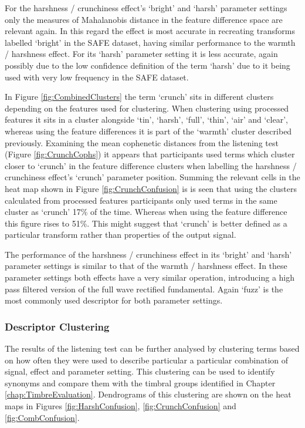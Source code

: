 			For the harshness / crunchiness effect's `bright' and `harsh' parameter settings only the measures
			of Mahalanobis distance in the feature difference space are relevant again. In this regard the
			effect is most accurate in recreating transforms labelled `bright' in the SAFE dataset, having
			similar performance to the warmth / harshness effect. For its `harsh' parameter setting it is less
			accurate, again possibly due to the low confidence definition of the term `harsh' due to it being
			used with very low frequency in the SAFE dataset.

			In Figure \ref{fig:CombinedClusters} the term `crunch' sits in different clusters depending on the
			features used for clustering. When clustering using processed features it sits in a cluster
			alongside `tin', `harsh', `full', `thin', `air' and `clear', whereas using the feature differences
			it is part of the `warmth' cluster described previously. Examining the mean cophenetic distances
			from the listening test (Figure \ref{fig:CrunchCophs}) it appears that participants used terms
			which cluster closer to `crunch' in the feature difference clusters when labelling the harshness /
			crunchiness effect's `crunch' parameter position. Summing the relevant cells in the heat map shown
			in Figure \ref{fig:CrunchConfusion} is is seen that using the clusters calculated from processed
			features participants only used terms in the same cluster as `crunch' 17\% of the time. Whereas
			when using the feature difference this figure rises to 51\%. This might suggest that `crunch' is
			better defined as a particular transform rather than properties of the output signal.

			The performance of the harshness / crunchiness effect in its `bright' and `harsh' parameter
			settings is similar to that of the warmth / harshness effect. In these parameter settings both
			effects have a very similar operation, introducing a high pass filtered version of the full wave
			rectified fundamental. Again `fuzz' is the most commonly used descriptor for both parameter
			settings.

		\subsubsection*{Descriptor Clustering}
			The results of the listening test can be further analysed by clustering terms based on how often
			they were used to describe particular a particular combination of signal, effect and parameter
			setting. This clustering can be used to identify synonyms and compare them with the timbral groups
			identified in Chapter \ref{chap:TimbreEvaluation}. Dendrograms of this clustering are shown on the
			heat maps in Figures \ref{fig:HarshConfusion}, \ref{fig:CrunchConfusion} and
			\ref{fig:CombConfusion}.


